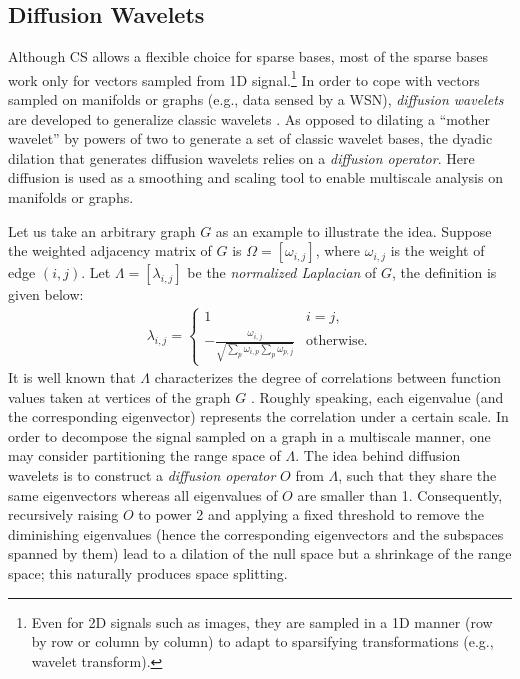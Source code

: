 \documentclass[conference]{IEEEtran}
\begin{document}
  \subsection{Diffusion Wavelets} \label{sec:diffwave}
Although CS allows a flexible choice for sparse bases, most of the sparse bases work only for vectors sampled from 1D signal.\footnote{Even for 2D signals such as images, they are sampled in a 1D manner (row by row or column by column) to adapt to sparsifying transformations (e.g., wavelet transform).} In order to cope with vectors sampled on manifolds or graphs (e.g., data sensed by a WSN), \textit{diffusion wavelets} are developed to generalize classic wavelets \cite{CoifmanM-04}. As opposed to dilating a ``mother wavelet'' by powers of two to generate a set of classic wavelet bases, the dyadic dilation that generates diffusion wavelets relies on a \textit{diffusion operator}. Here diffusion is used as a smoothing and scaling tool to enable multiscale analysis on manifolds or graphs.

    Let us take an arbitrary graph $G$ as an example to illustrate the idea. Suppose the weighted adjacency matrix of $G$ is $\Omega=[\omega_{i,j}]$, where $\omega_{i,j}$ is the weight of edge $(i,j)$. Let $\Lambda=[\lambda_{i,j}]$ be the \textit{normalized Laplacian} of $G$, the definition is given below:
    \begin{eqnarray}
    \lambda_{i,j} =
      \begin{cases}
      1 & i=j, \\
      - \frac{\omega_{i,j}}{\sqrt{\sum_{p}{\omega_{i,p}} \sum_{p}{\omega_{p,j}}}} & \mathrm{otherwise}.
      \end{cases}
    \label{eq:lap}
    \end{eqnarray}
It is well known that $\Lambda$ characterizes the degree of correlations between function values taken at vertices of the graph $G$ \cite{Chung97}. Roughly speaking, each eigenvalue (and the corresponding eigenvector) represents the correlation under a certain scale. In order to decompose the signal sampled on a graph in a multiscale manner, one may consider partitioning the range space of $\Lambda$. The idea behind diffusion wavelets is to construct a \textit{diffusion operator} $O$ from $\Lambda$, such that they share the same eigenvectors whereas all eigenvalues of $O$ are smaller than 1. Consequently, recursively raising $O$ to power 2 and applying a fixed threshold to remove the diminishing eigenvalues (hence the corresponding eigenvectors and the subspaces spanned by them) lead to a  dilation of the null space but a shrinkage of the range space; this naturally produces space splitting.
\end{document}
